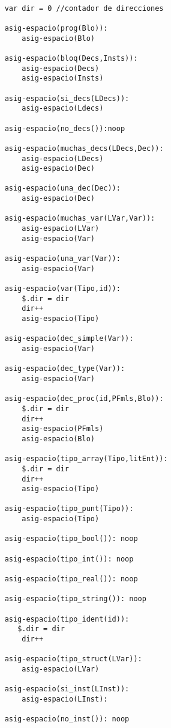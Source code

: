 \begin{lstlisting}

    var dir = 0 //contador de direcciones

    asig-espacio(prog(Blo)):
        asig-espacio(Blo)

    asig-espacio(bloq(Decs,Insts)):
        asig-espacio(Decs)
        asig-espacio(Insts)
    
    asig-espacio(si_decs(LDecs)):
        asig-espacio(Ldecs)
    
    asig-espacio(no_decs()):noop
    
    asig-espacio(muchas_decs(LDecs,Dec)):
        asig-espacio(LDecs)
        asig-espacio(Dec)
    
    asig-espacio(una_dec(Dec)):
        asig-espacio(Dec)

    asig-espacio(muchas_var(LVar,Var)):
        asig-espacio(LVar)
        asig-espacio(Var)

    asig-espacio(una_var(Var)):
        asig-espacio(Var)
    
    asig-espacio(var(Tipo,id)):
        $.dir = dir
        dir++
        asig-espacio(Tipo)
    
    asig-espacio(dec_simple(Var)):
        asig-espacio(Var)

    asig-espacio(dec_type(Var)):
        asig-espacio(Var)
    
    asig-espacio(dec_proc(id,PFmls,Blo)):
        $.dir = dir
        dir++
        asig-espacio(PFmls)
        asig-espacio(Blo)

    asig-espacio(tipo_array(Tipo,litEnt)):
        $.dir = dir
        dir++
        asig-espacio(Tipo)

    asig-espacio(tipo_punt(Tipo)):
        asig-espacio(Tipo)

    asig-espacio(tipo_bool()): noop

    asig-espacio(tipo_int()): noop

    asig-espacio(tipo_real()): noop

    asig-espacio(tipo_string()): noop

    asig-espacio(tipo_ident(id)):
       $.dir = dir
        dir++

    asig-espacio(tipo_struct(LVar)):
        asig-espacio(LVar)

    asig-espacio(si_inst(LInst)):
        asig-espacio(LInst):

    asig-espacio(no_inst()): noop


\end{lstlisting}
